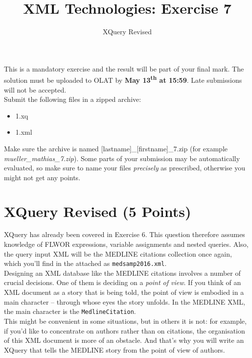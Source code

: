\documentclass[a4paper, 12pt]{scrartcl}
\title{XML Technologies: Exercise 7}
\date{}
\subtitle{XQuery Revised}
\begin{document}
\maketitle\vspace{-12ex}

\noindent This is a mandatory exercise and the result will be part of your final mark. The solution must be uploaded to OLAT by \textbf{May 13\textsuperscript{th} at 15:59}. Late submissions will not be accepted.\\


\noindent Submit the following files in a zipped archive:
\begin{itemize}
\item 1.xq
\item 1.xml
\end{itemize}

\noindent Make sure the archive is named [lastname]\_[firstname]\_7.zip (for example \textit{mueller\_mathias\_7.zip}). Some parts of your submission may be automatically evaluated, so make sure to name your files \textit{precisely} as prescribed, otherwise you might not get any points.

\section{XQuery Revised (5 Points)}

XQuery has already been covered in Exercise 6. This question therefore assumes knowledge of FLWOR expressions, variable assignments and nested queries. Also, the query input XML will be the MEDLINE citations collection once again, which you'll find in the attached as \texttt{medsamp2016.xml}. \\

\noindent Designing an XML database like the MEDLINE citations involves a number of crucial decisions. One of them is deciding on a \textit{point of view}. If you think of an XML document as a story that is being told, the point of view is embodied in a main character -- through whose eyes the story unfolds. In the MEDLINE XML, the main character is the \texttt{MedlineCitation}. \\

\noindent This might be convenient in some situations, but in others it is not: for example, if you'd like to concentrate on authors rather than on citations, the organisation of this XML document is more of an obstacle. And that's why you will write an XQuery that tells the MEDLINE story from the point of view of authors. \\
\end{document}
